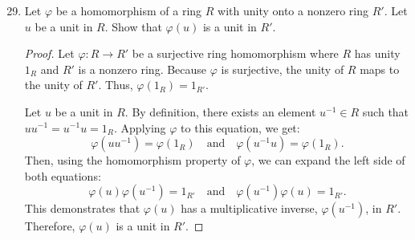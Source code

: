 \documentclass[12pt, oneside]{book}
\newcommand{\pf}[1]{
    \begin{customframedproof}[linecolor=orangehdx!75]
        \begin{proof}
        #1
        \end{proof}
    \end{customframedproof}
}
\begin{document}
\begin{enumerate}
    \setcounter{enumi}{28}   
    \item Let \(\varphi\) be a homomorphism of a ring \(R\) with unity onto a nonzero ring \(R'\). Let \(u\) be a unit in \(R\). Show that \(\varphi(u)\) is a unit in \(R'\).
    \pf{
        Let \(\varphi : R \to R'\) be a surjective ring homomorphism where \(R\) has unity \(1_R\) and \(R'\) is a nonzero ring. Because \(\varphi\) is surjective, the unity of \(R\) maps to the unity of \(R'\). Thus, \(\varphi(1_R) = 1_{R'}\). 

        Let \(u\) be a unit in \(R\). By definition, there exists an element \(u^{-1} \in R\) such that \(u u^{-1} = u^{-1} u = 1_R\). Applying \(\varphi\) to this equation, we get:
        \[
            \varphi(u u^{-1}) = \varphi(1_R) \quad \text{and} \quad \varphi(u^{-1} u) = \varphi(1_R).
        \]
        Then, using the homomorphism property of \(\varphi\), we can expand the left side of both equations:
        \[
            \varphi(u)\varphi(u^{-1}) = 1_{R'} \quad \text{and} \quad \varphi(u^{-1})\varphi(u) = 1_{R'}.
        \]
        This demonstrates that \(\varphi(u)\) has a multiplicative inverse, \(\varphi(u^{-1})\), in \(R'\). Therefore, \(\varphi(u)\) is a unit in \(R'\).
    }


\end{enumerate}
\end{document}
